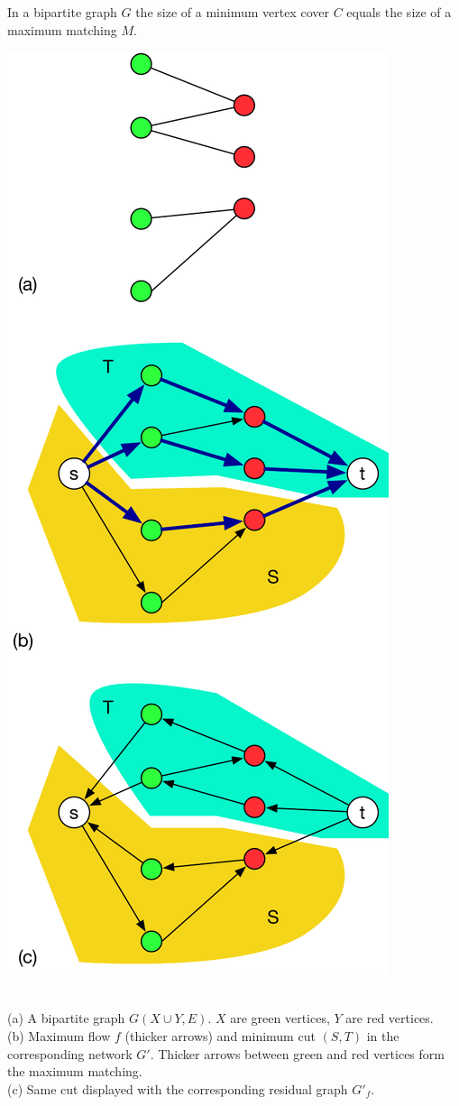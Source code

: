 \begin{thm}\label{koenig}
In a bipartite graph $G$ the size of a minimum vertex cover $C$ equals the size of a maximum matching $M$. 
\end{thm}

\begin{marginfigure}[0.3in]
\includegraphics[scale=0.5]{koenig.pdf}
\caption{\\
             (a) A bipartite graph $G(X \cup Y, E)$. $X$ are green vertices, $Y$ are red vertices.\\
             (b) Maximum flow $f$ (thicker arrows) and minimum cut $(S, T)$ in the corresponding network $G'$. Thicker arrows between green and red vertices form the maximum matching.\\
             (c) Same cut displayed with the corresponding residual graph $G'_f$.}
	\label{koenig_example}
\end{marginfigure}

